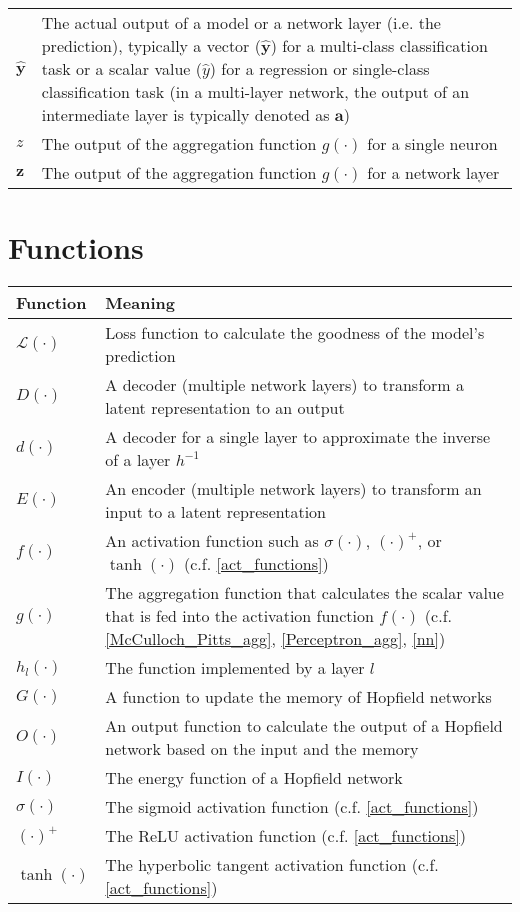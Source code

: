 \begin{tabular}{ p{3cm} p{11cm} }
	$\boldsymbol{\hat{y}}$ & The actual output of a model or a network layer (i.e. the prediction), typically a vector ($\boldsymbol{\hat{y}}$) for a multi-class classification task or a scalar value ($\hat{y}$) for a regression or single-class classification task (in a multi-layer network, the output of an intermediate layer is typically denoted as $\boldsymbol{a}$)\\
	$z$ & The output of the aggregation function $g(\cdot)$ for a single neuron\\
	$\boldsymbol{z}$ & The output of the aggregation function $g(\cdot)$ for a network layer\\
\end{tabular}


\section{Functions}

\begin{tabular}{ p{3cm} p{11cm} }
	\textbf{Function} & \textbf{Meaning}\\
	\hline
	$\mathcal{L}(\cdot)$ & Loss function to calculate the goodness of the model's prediction\\
	$D(\cdot)$ & A decoder (multiple network layers) to transform a latent representation to an output\\
	$d(\cdot)$ & A decoder for a single layer to approximate the inverse of a layer $h^{-1}$\\
	$E(\cdot)$ & An encoder (multiple network layers) to transform an input to a latent representation\\
	$f(\cdot)$ & An activation function such as $\sigma(\cdot)$, $(\cdot)^{+}$, or $\tanh(\cdot)$ (c.f. \eqref{act_functions})\\
	$g(\cdot)$ & The aggregation function that calculates the scalar value that is fed into the activation function $f(\cdot)$ (c.f. \eqref{McCulloch_Pitts_agg}, \eqref{Perceptron_agg}, \eqref{nn})\\
	$h_l(\cdot)$ & The function implemented by a layer $l$\\
	$G(\cdot)$ & A function to update the memory of Hopfield networks\\
	$O(\cdot)$ & An output function to calculate the output of a Hopfield network based on the input and the memory\\
	$I(\cdot)$ & The energy function of a Hopfield network\\
	$\sigma(\cdot)$ & The sigmoid activation function (c.f. \eqref{act_functions})\\
	$(\cdot)^{+}$ & The ReLU activation function (c.f. \eqref{act_functions})\\
	 $\tanh(\cdot)$ & The hyperbolic tangent activation function (c.f. \eqref{act_functions})\\
	
\end{tabular}
